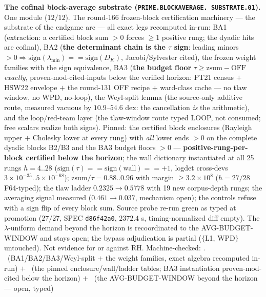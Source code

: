 \documentclass[11pt,a4paper]{article}
\theoremstyle{definition}
\begin{document}
\par\smallskip\noindent\textbf{The cofinal block-average
substrate (\texttt{PRIME.\allowbreak BLOCKAVERAGE.\allowbreak
SUBSTRATE.01}).}
One module ($12/12$).  The round-166 frozen-block certification
machinery --- the substrate of the endgame arc --- all exact
legs recomputed in-run: BA1 (extraction: a certified block sum
$> 0$ forces $\ge 1$ positive rung; the dyadic hits are
cofinal), BA2 (\textbf{the determinant chain is the $\tau$
sign}: leading minors $> 0 \Rightarrow \mathrm{sign}(\lambda_{\min})
== \mathrm{sign}(D_K)$, Jacobi/Sylvester cited), the frozen
weight families with the sign equivalence, BA3 (\textbf{the
budget floor} $\tau \ge \mathrm{zsum} - \mathrm{OFF}$
\emph{exactly}, proven-mod-cited-inputs below the verified
horizon: PT21 census $+$ HSW22 envelope $+$ the round-131 OFF
recipe $+$ ward-class cache --- no tlaw window, no WPD,
no-loop), the Weyl-split lemma (the source-only additive route,
measured vacuous by $10.9$--$54.6$ dex: the cancellation
\emph{is} the arithmetic), and the loop/red-team layer (the
tlaw-window route typed LOOP, not consumed; free scalars realize
both signs).  Pinned: the certified block enclosures (Rayleigh
upper $+$ Cholesky lower at every rung) with \emph{all} lower
ends $> 0$ on the complete dyadic blocks B2/B3 and the BA3
budget floors $> 0$ --- \textbf{positive-rung-per-block
certified below the horizon}; the wall dictionary instantiated
at all 25 rungs $h = 4..28$ ($\mathrm{sign}(\tau) ==
\mathrm{sign}(\mathrm{wall}) == +1$, logdet cross-devs
$3\times10^{-35}..5\times10^{-68}$); $\mathrm{zsum}/\tau =
0.88..0.96$ with margin $\ge 3.2\times10^8$ ($h = 27/28$
F64-typed); the tlaw ladder $0.2325 \to 0.5778$ with 19 new
corpus-depth rungs; the averaging signal measured ($0.461 \to
0.037$, mechanism open); the controls refuse with a sign flip
of every block sum.  Source probe re-run green as typed at
promotion ($27/27$, SPEC \texttt{d86f42a0}, $2372.4$ s,
timing-normalized diff empty).  The $\lambda$-uniform demand
beyond the horizon is recoordinated to the AVG-BUDGET-WINDOW
and stays open; the bypass adjudication is partial ($\{$L1,
WPD$\}$ untouched).  Not evidence for or against RH.
Machine-checked:
.
\mE\ (BA1/BA2/BA3/Weyl-split $+$ the weight families, exact
algebra recomputed in-run) $+$ \mC\ (the pinned
enclosure/wall/ladder tables; BA3 instantiation
proven-mod-cited below the horizon) $+$ \mO\ (the
AVG-BUDGET-WINDOW beyond the horizon --- open, typed)
\par\smallskip
\end{document}
